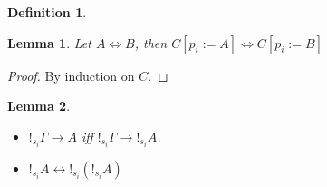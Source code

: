 \documentclass[a4paper]{article}
\newtheorem{lemma}{Lemma}
\newtheorem{defin}{Definition}
\begin{document}
\begin{defin}
\begin{prooftree}
\end{prooftree}

    \begin{prooftree}
    \end{prooftree}

    \begin{prooftree}
    \end{prooftree}

    \begin{prooftree}
    \end{prooftree}

    \begin{prooftree}
    \end{prooftree}
\end{defin}

\begin{lemma}
  Let $A \Leftrightarrow B$, then $C [p_i := A] \Leftrightarrow C [p_i := B]$
\end{lemma}

\begin{proof}
  By induction on $C$.
\end{proof}

\begin{lemma}
  \begin{itemize}
  \item $!_{s_i} \Gamma \rightarrow A$ iff $!_{s_i} \Gamma \rightarrow !_{s_i} A$.
  \item $!_{s_i} A \leftrightarrow !_{s_i} (!_{s_i} A)$
\end{itemize}
\end{lemma}
\end{document}
